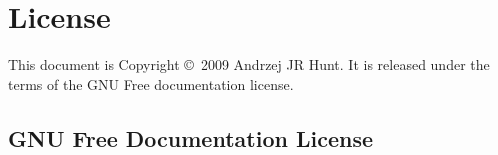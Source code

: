 \chapter{License}
This document is Copyright \copyright\ 2009 Andrzej JR Hunt. It is released under the terms of the GNU Free documentation license.
\section{GNU Free Documentation License}

